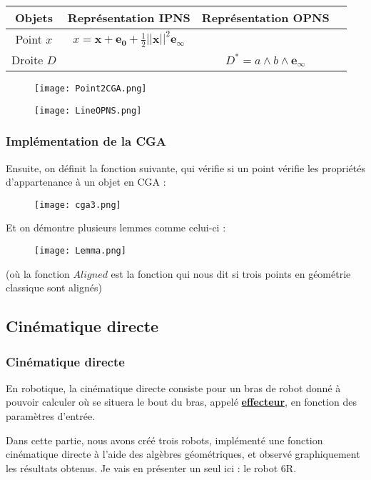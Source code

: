 \documentclass{beamer}
\newcommand{\sg}[1]{\textbf{\underline{#1}}}
\newcommand{\e}[1]{\bm{e_{#1}}}
\newcommand{\ei}{\e{\infty}}
\begin{document}
\begin{frame}
\begin{table}[h!]
\begin{center}

\begin{tabular}{|c|c|c|c|}
\hline

Objets & Représentation IPNS &  Représentation OPNS  \\\hline
Point $x$ & $x = \bm{x} + \bm{e_0} + \frac{1}{2}||\bm{x}||^2 \ei$ &   \\
\hline

Droite $D$  & & $D^* = a \wedge b \wedge \ei$  \\\hline

\end{tabular}
\end{center}
\renewcommand{\thetable}{\arabic{table}}
\end{table}
\begin{figure}[!ht]
\hspace*{-0.6cm}
\texttt{[image: Point2CGA.png]}
\end{figure}
\begin{figure}[!ht]
\hspace*{-0.6cm}
\texttt{[image: LineOPNS.png]}
\end{figure}
\end{frame}

\begin{frame}
\frametitle{Implémentation de la CGA}

Ensuite, on définit la fonction suivante, qui vérifie si un point vérifie les propriétés d'appartenance à un objet en CGA : 

\begin{figure}[!ht]
\hspace*{-1.1cm}
\texttt{[image: cga3.png]}
\end{figure}
\pause

Et on démontre plusieurs lemmes comme celui-ci : 
\begin{figure}[!ht]
\hspace*{-0.6cm}
\texttt{[image: Lemma.png]}
\end{figure}
(où la fonction $Aligned$ est la fonction qui nous dit si trois points en géométrie classique sont alignés) 
\end{frame}


\subsection{Cinématique directe}
\begin{frame}
\frametitle{Cinématique directe}

En robotique, la cinématique directe consiste pour un bras de robot donné à pouvoir calculer où se situera le bout du bras, appelé \sg{effecteur}, en fonction des paramètres d'entrée.\pause\bigskip

Dans cette partie, nous avons créé trois robots, implémenté une fonction cinématique directe à l'aide des algèbres géométriques, et observé graphiquement les résultats obtenus. Je vais en présenter un seul ici : le robot 6R.
\end{frame}
\end{document}
